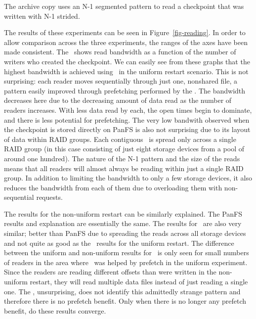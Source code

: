 The archive copy uses an N-1 segmented pattern to
read a checkpoint that was written with N-1 strided.
\fi

The results of these experiments can be seen in Figure~\ref{fig-reading}. In
order to allow comparison across the three experiments, the ranges of the axes
have been made consistent. The \yaxis\ shows read bandwidth as a function of
the number of writers who created the checkpoint. We can easily see from these
graphs that the highest bandwidth is achieved using \plfs\ in the uniform
restart scenario. This is not surprising: each reader moves sequentially
through just one, nonshared file, a pattern easily improved through prefetching
performed by the \upfs. The bandwidth decreases here due to the decreasing
amount of data read as the number of readers increases. With less data read by
each, the open times begin to dominate, and there is less potential for
prefetching. The very low bandwith observed when the checkpoint is stored
directly on PanFS is also not surprising due to its layout of data within RAID
groups. Each contiguous \GB\ is spread only across a single RAID group (in this
case consisting of just eight storage devices from a pool of around one
hundred). The nature of the N-1 pattern and the size of the reads means that
all readers will almost always be reading within just a single RAID group. In
addition to limiting the bandwidth to only a few storage devices, it also
reduces the bandwidth from each of them due to overloading them with
non-sequential requests.

The results for the non-uniform restart can be similarly explained. The PanFS
results and explanation are essentially the same. The results for \plfs\ are
also very similar; better than PanFS due to spreading the reads across all
storage devices and not quite as good as the \plfs\ results for the uniform
restart. The difference between the uniform and non-uniform results for \plfs\
is only seen for small numbers of readers in the area where \plfs\ was helped
by prefetch in the uniform experiment. Since the readers are reading different
offsets than were written in the non-uniform restart, they will read multiple
data files instead of just reading a single one. The \upfs, unsurprising,
does not identify this admittedly strange pattern and therefore there is no
prefetch benefit. Only when there is no longer any prefetch benefit, 
do these results converge.

